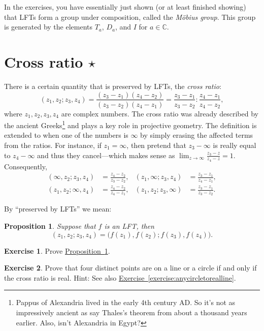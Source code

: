 \documentclass[12pt,openany]{book}
\newcommand{\C}{{\mathbb{C}}}
\newcommand{\myindex}[1]{#1\index{#1}}
\newcommand{\myquote}[1]{``#1''}
\theoremstyle{plain}
\newtheorem{prop}[thm]{Proposition}
\theoremstyle{remark}
\theoremstyle{definition}
\newenvironment{exbox}{%
    \def\FrameCommand{\vrule width 1pt \relax\hspace{10pt}}%
    \MakeFramed{\advance\hsize-\width\FrameRestore}%
}{%
    \endMakeFramed
}
\theoremstyle{exercise}
\newtheorem{exercise}{Exercise}[section]
\theoremstyle{example}
\newcommand{\exerciseref}[1]{\hyperref[#1]{Exercise~\ref*{#1}}}
\newcommand{\propref}[1]{\hyperref[#1]{Proposition~\ref*{#1}}}
\begin{document}
In the exercises, you have essentially just shown (or at least finished
showing) that LFTs form a group under composition,
called the \emph{\myindex{M\"obius group}}.
This group is generated by the elements
$T_a$, $D_a$, and $I$ for $a\in \C$.


\section{Cross ratio \texorpdfstring{$\star$}{*}}

There is a certain quantity that is preserved by LFTs, the
\emph{\myindex{cross ratio}}:
%
\begin{equation*}
(z_1,z_2;z_3,z_4)
=
\frac{(z_3-z_1)(z_4-z_2)}{(z_3-z_2)(z_4-z_1)}
=
\frac{z_3-z_1}{z_3-z_2} : 
\frac{z_4-z_1}{z_4-z_2} ,
\end{equation*}
where $z_1,z_2,z_3,z_4$ are complex numbers.  The cross ratio
was already described by the ancient Greeks\footnote{Pappus of Alexandria
lived in the early 4th century AD\@.  So it's not as impressively ancient as say
Thales's theorem from about a thousand years earlier.  Also, isn't
Alexandria in Egypt?}
and plays a key role in projective geometry.
The definition is extended to when one of the numbers is $\infty$ by simply
erasing the affected terms from the ratios.  For instance, if $z_1=\infty$,
then pretend that $z_3-\infty$
is really equal to $z_4-\infty$ and
thus they cancel---which makes sense as $\lim_{z\to\infty} \frac{z_3-z}{z_4-z} = 1$.
Consequently,
\begin{align*}
(\infty,z_2;z_3,z_4)
& =
\frac{z_4-z_2}{z_3-z_2}
,
&
(z_1,\infty;z_3,z_4)
& =
\frac{z_3-z_1}{z_4-z_1}
,
\\
(z_1,z_2;\infty,z_4)
& =
\frac{z_4-z_2}{z_4-z_1}
,
& 
(z_1,z_2;z_3,\infty)
& =
\frac{z_3-z_1}{z_3-z_2} .
\end{align*}

By \myquote{preserved by LFTs} we mean:

\begin{prop} \label{prop:crossratioinvariant}
Suppose that $f$ is an LFT\@, then
\begin{equation*}
(z_1,z_2;z_3,z_4) =
\bigl(f(z_1),f(z_2);f(z_3),f(z_4)\bigr) .
\end{equation*}
\end{prop}

\begin{exbox}
\begin{exercise}
Prove \propref{prop:crossratioinvariant}.
\end{exercise}

\begin{exercise}
Prove that four distinct points are on a line or a circle if and only if the cross
ratio is real.
Hint: See also \exerciseref{exercise:anycircletorealline}.
\end{exercise}
\end{exbox}
\end{document}
